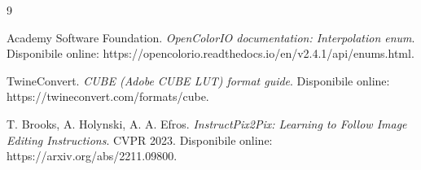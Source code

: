\documentclass[12pt,a4paper]{report}
\renewcommand{\texttt}[1]{{\normalfont #1}}
\begin{document}
\begin{thebibliography}{9}

Academy Software Foundation.
\textit{OpenColorIO documentation: Interpolation enum}.
Disponibile online: \texttt{https://opencolorio.readthedocs.io/en/v2.4.1/api/enums.html}.

TwineConvert.
\textit{CUBE (Adobe CUBE LUT) format guide}.
Disponibile online: \texttt{https://twineconvert.com/formats/cube}.

T. Brooks, A. Holynski, A. A. Efros.
\textit{InstructPix2Pix: Learning to Follow Image Editing Instructions}.
CVPR 2023. Disponibile online: \texttt{https://arxiv.org/abs/2211.09800}.

\end{thebibliography}
\end{document}
